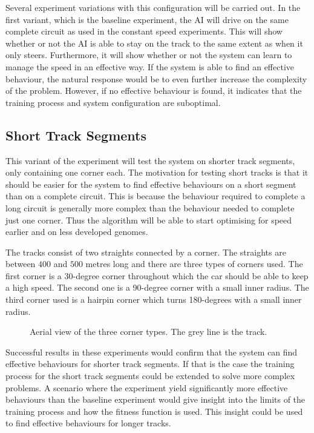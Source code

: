 Several experiment variations with this configuration will be carried out. In the first variant, which is the baseline experiment, the AI will drive on the same complete circuit as used in the constant speed experiments. This will show whether or not the AI is able to stay on the track to the same extent as when it only steers. Furthermore, it will show whether or not the system can learn to manage the speed in an effective way. If the system is able to find an effective behaviour, the natural response would be to even further increase the complexity of the problem. However, if no effective behaviour is found, it indicates that the training process and system configuration are suboptimal. 

\subsection{Short Track Segments}
\label{subsec:shorttracksegment}
This variant of the experiment will test the system on shorter track segments, only containing one corner each. The motivation for testing short tracks is that it should be easier for the system to find effective behaviours on a short segment than on a complete circuit. This is because the behaviour required to complete a long circuit is generally more complex than the behaviour needed to complete just one corner. Thus the algorithm will be able to start optimising for speed earlier and on less developed genomes. 

The tracks consist of two straights connected by a corner. The straights are between $400$ and $500$ metres long and there are three types of corners used. The first corner is a 30-degree corner throughout which the car should be able to keep a high speed. The second one is a 90-degree corner with a small inner radius. The third corner used is a hairpin corner which turns 180-degrees with a small inner radius. 
\begin{figure}[H]
    \centering
    \qquad
    \qquad

    \caption{Aerial view of the three corner types. The grey line is the track.}
\end{figure}

\noindent
Successful results in these experiments would confirm that the system can find effective behaviours for shorter track segments. If that is the case the training process for the short track segments could be extended to solve more complex problems. A scenario where the experiment yield significantly more effective behaviours than the baseline experiment would give insight into the limits of the training process and how the fitness function is used. This insight could be used to find effective behaviours for longer tracks. 

